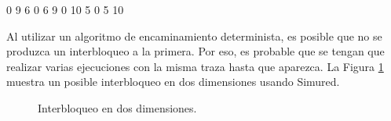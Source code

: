\begin{itemize}
    \begin{mycode}[style=mycodestyle, caption={Traza para provocar un interbloqueo en dos dimensiones.}, label=lst:traza2b]
0 9 6
0 6 9
0 10 5
0 5 10
    \end{mycode}

    Al utilizar un algoritmo de encaminamiento determinista, es posible que no se produzca un interbloqueo a la primera. Por eso, es probable que se tengan que realizar varias ejecuciones con la misma traza hasta que aparezca. La Figura \ref{fig:interbloqueo-2d} muestra un posible interbloqueo en dos dimensiones usando Simured.

    \begin{figure}[h] %
      \centering
      \caption{Interbloqueo en dos dimensiones.}
      \label{fig:interbloqueo-2d}
    \end{figure}

\end{itemize}